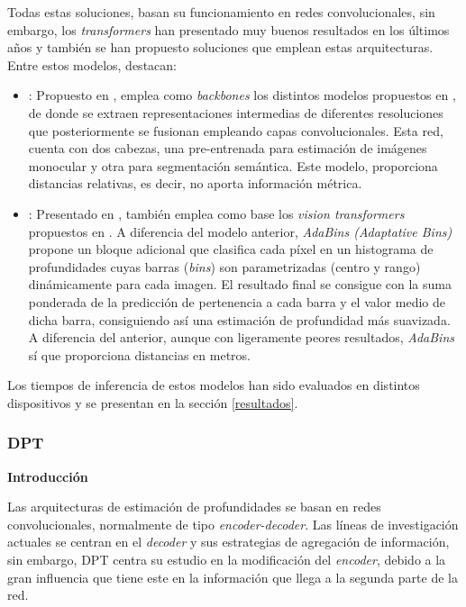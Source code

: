 Todas estas soluciones, basan su funcionamiento en redes convolucionales, sin embargo, los \textit{transformers} han presentado muy buenos resultados en los últimos años y también se han propuesto soluciones que emplean estas arquitecturas. Entre estos modelos, destacan:
\begin{itemize}
    \item {}: Propuesto en \cite{visiontransformersDPT}, emplea como \textit{backbones} los distintos modelos propuestos en \cite{image16x16words}, de donde se extraen representaciones intermedias de diferentes resoluciones que posteriormente se fusionan empleando capas convolucionales. Esta red, cuenta con dos cabezas, una pre-entrenada para estimación de imágenes monocular y otra para segmentación semántica. Este modelo, proporciona distancias relativas, es decir, no aporta información métrica.
    \item {}: Presentado en \cite{bhat2020adabins}, también emplea como base los \textit{vision transformers} propuestos en \cite{image16x16words}. A diferencia del modelo anterior, \textit{AdaBins (Adaptative Bins)} propone un bloque adicional que clasifica cada píxel en un histograma de profundidades cuyas barras (\textit{bins}) son parametrizadas (centro y rango) dinámicamente para cada imagen. El resultado final se consigue con la suma ponderada de la predicción de pertenencia a cada barra y el valor medio de dicha barra, consiguiendo así una estimación de profundidad más suavizada. A diferencia del anterior, aunque con ligeramente peores resultados, \textit{AdaBins} sí que proporciona distancias en metros.
\end{itemize}
Los tiempos de inferencia de estos modelos han sido evaluados en distintos dispositivos y se presentan en la sección \ref{resultados}.


\subsubsection{DPT}
\textbf{Introducción}

Las arquitecturas de estimación de profundidades se basan en redes convolucionales, normalmente de tipo \textit{encoder-decoder}. Las líneas de investigación actuales se centran en el \textit{decoder} y sus estrategias de agregación de información, sin embargo, DPT centra su estudio en la modificación del \textit{encoder}, debido a la gran influencia que tiene este en la información que llega a la segunda parte de la red.

